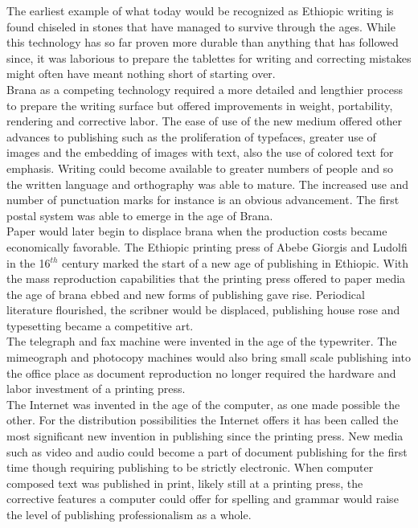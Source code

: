 The earliest example of what today would be recognized as Ethiopic writing is found chiseled in stones that have managed to survive through the ages.  While this technology has so far proven more durable than anything that has followed since, it was laborious to prepare the tablettes for writing and correcting mistakes might often have meant nothing short of starting over. \\

Brana as a competing technology required a more detailed and lengthier process to prepare the writing surface but offered improvements in weight, portability, rendering and corrective labor.  The ease of use of the new medium offered other advances to publishing such as the proliferation of typefaces, greater use of images and the embedding of images with text, also the use of colored text for emphasis.  Writing could become available to greater numbers of people and so the written language and orthography was able to mature.  The increased use and number of punctuation marks for instance is an obvious advancement.  The first postal system was able to emerge in the age of Brana.\\

Paper would later begin to displace brana when the production costs became economically favorable.  The Ethiopic printing press of Abebe Giorgis and Ludolfi in the 16$^{th}$ century marked the start of a new age of publishing in Ethiopic.  With the mass reproduction capabilities that the printing press offered to paper media the age of brana ebbed and new forms of publishing gave rise.  Periodical literature flourished, the scribner would be displaced, publishing house rose and typesetting became a competitive art.\\

The telegraph and fax machine were invented in the age of the typewriter.  The mimeograph and photocopy machines would also bring small scale publishing into the office place as document reproduction no longer required the hardware and labor investment of a printing press.\\

The Internet was invented in the age of the computer, as one made possible the other.  For the distribution possibilities the Internet offers it has been called the most significant new invention in publishing since the printing press.  
New media such as video and audio could become a part of document publishing for the first time though requiring publishing to be strictly electronic.  When computer composed text was published in print, likely still at a printing press, the corrective features a computer could offer for spelling and grammar would raise the level of publishing professionalism as a whole.\\

